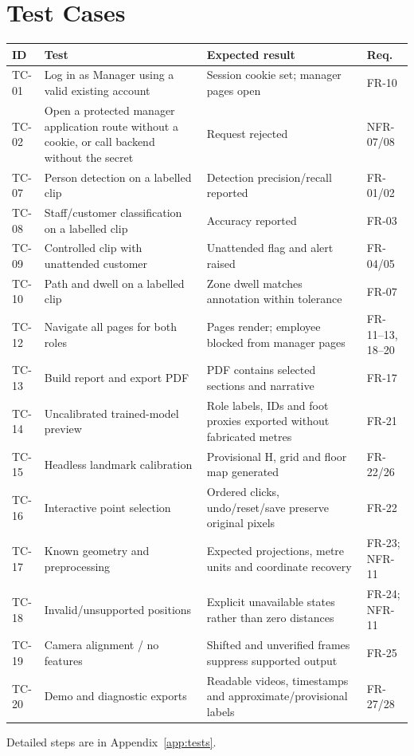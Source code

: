 \section{Test Cases}
\begin{longtable}{P{0.09\textwidth}P{0.3\textwidth}P{0.32\textwidth}P{0.14\textwidth}}
\toprule
ID & Test & Expected result & Req.\\
\midrule
\endhead
TC-01 & Log in as Manager using a valid existing account & Session cookie set; manager pages open & FR-10\\
TC-02 & Open a protected manager application route without a cookie, or call backend without the secret & Request rejected & NFR-07/08\\
TC-07 & Person detection on a labelled clip & Detection precision/recall reported & FR-01/02\\
TC-08 & Staff/customer classification on a labelled clip & Accuracy reported & FR-03\\
TC-09 & Controlled clip with unattended customer & Unattended flag and alert raised & FR-04/05\\
TC-10 & Path and dwell on a labelled clip & Zone dwell matches annotation within tolerance & FR-07\\
TC-12 & Navigate all pages for both roles & Pages render; employee blocked from manager pages & FR-11--13, 18--20\\
TC-13 & Build report and export PDF & PDF contains selected sections and narrative & FR-17\\
TC-14 & Uncalibrated trained-model preview & Role labels, IDs and foot proxies exported without fabricated metres & FR-21\\
TC-15 & Headless landmark calibration & Provisional H, grid and floor map generated & FR-22/26\\
TC-16 & Interactive point selection & Ordered clicks, undo/reset/save preserve original pixels & FR-22\\
TC-17 & Known geometry and preprocessing & Expected projections, metre units and coordinate recovery & FR-23; NFR-11\\
TC-18 & Invalid/unsupported positions & Explicit unavailable states rather than zero distances & FR-24; NFR-11\\
TC-19 & Camera alignment / no features & Shifted and unverified frames suppress supported output & FR-25\\
TC-20 & Demo and diagnostic exports & Readable videos, timestamps and approximate/provisional labels & FR-27/28\\
\bottomrule
\end{longtable}
Detailed steps are in Appendix~\ref{app:tests}.

